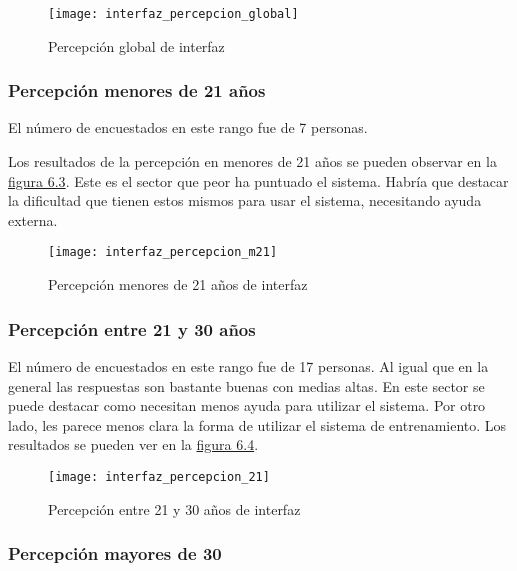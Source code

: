 \begin{figure}[htb]
  \centering
  \texttt{[image: interfaz\_percepcion\_global]}
  \caption[Percepción global de interfaz]{Percepción global de interfaz}
  \label{fig:Percepción global de interfaz}
\end{figure}

\subsubsection{Percepción menores de 21 años}

El número de encuestados en este rango fue de 7 personas.

Los resultados de la percepción en menores de 21 años se pueden observar en la \hyperref[fig:Percepción menores de 21 años de interfaz]{figura 6.3}.
Este es el sector que peor ha puntuado el sistema. Habría que destacar la dificultad
que tienen estos mismos para usar el sistema, necesitando ayuda externa.

\begin{figure}[htb]
  \centering
  \texttt{[image: interfaz\_percepcion\_m21]}
  \caption[Percepción menores de 21 años de interfaz]{Percepción menores de 21 años de interfaz}
  \label{fig:Percepción menores de 21 años de interfaz}
\end{figure}

\subsubsection{Percepción entre 21 y 30 años}

El número de encuestados en este rango fue de 17 personas. Al igual que en la general las respuestas
son bastante buenas con medias altas. En este sector se puede destacar como necesitan menos ayuda
para utilizar el sistema. Por otro lado, les parece menos clara la forma de utilizar el sistema
de entrenamiento. Los resultados se pueden ver en la \hyperref[fig:Percepción entre 21 y 30 años de interfaz]{figura 6.4}.

\begin{figure}[htb]
  \centering
  \texttt{[image: interfaz\_percepcion\_21]}
  \caption[Percepción entre 21 y 30 años de interfaz]{Percepción entre 21 y 30 años de interfaz}
  \label{fig:Percepción entre 21 y 30 años de interfaz}
\end{figure}

\subsubsection{Percepción mayores de 30}

